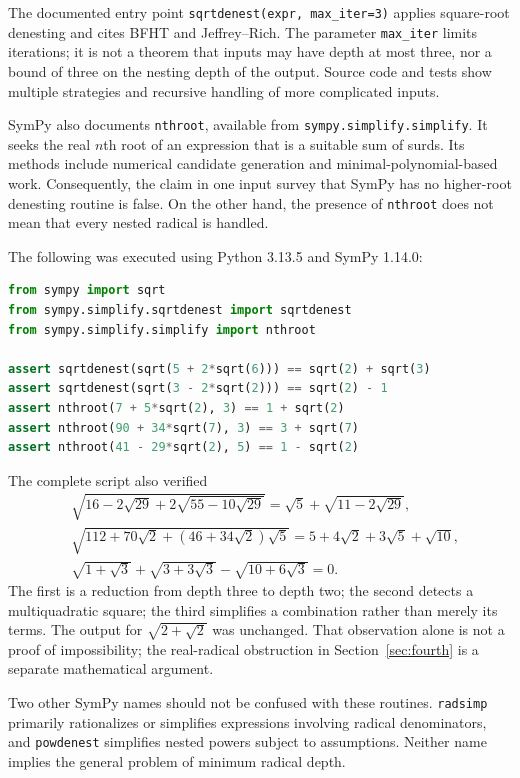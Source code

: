 \documentclass[11pt,a4paper]{article}
\theoremstyle{definition}
\theoremstyle{remark}
\numberwithin{equation}{section}
\begin{document}
The documented entry point \texttt{sqrtdenest(expr, max\_iter=3)} applies square-root denesting and cites BFHT and Jeffrey--Rich. The parameter \texttt{max\_iter} limits iterations; it is not a theorem that inputs may have depth at most three, nor a bound of three on the nesting depth of the output. Source code and tests show multiple strategies and recursive handling of more complicated inputs.\cite{sympydocs,sympysource,sympytests}

SymPy also documents \texttt{nthroot}, available from \texttt{sympy.simplify.simplify}. It seeks the real $n$th root of an expression that is a suitable sum of surds. Its methods include numerical candidate generation and minimal-polynomial-based work. Consequently, the claim in one input survey that SymPy has no higher-root denesting routine is false. On the other hand, the presence of \texttt{nthroot} does not mean that every nested radical is handled.\cite{sympydocs}

The following was executed using Python 3.13.5 and SymPy 1.14.0:
\begin{lstlisting}[language=Python]
from sympy import sqrt
from sympy.simplify.sqrtdenest import sqrtdenest
from sympy.simplify.simplify import nthroot

assert sqrtdenest(sqrt(5 + 2*sqrt(6))) == sqrt(2) + sqrt(3)
assert sqrtdenest(sqrt(3 - 2*sqrt(2))) == sqrt(2) - 1
assert nthroot(7 + 5*sqrt(2), 3) == 1 + sqrt(2)
assert nthroot(90 + 34*sqrt(7), 3) == 3 + sqrt(7)
assert nthroot(41 - 29*sqrt(2), 5) == 1 - sqrt(2)
\end{lstlisting}

The complete script also verified
\begin{align}
 &\sqrt{16-2\sqrt{29}+2\sqrt{55-10\sqrt{29}}}
     =\sqrt5+\sqrt{11-2\sqrt{29}},\label{eq:deepcas}\\
 &\sqrt{112+70\sqrt2+(46+34\sqrt2)\sqrt5}
     =5+4\sqrt2+3\sqrt5+\sqrt{10},\label{eq:multicas}\\
 &\sqrt{1+\sqrt3}+\sqrt{3+3\sqrt3}-\sqrt{10+6\sqrt3}=0.\label{eq:cancelcas}
\end{align}
The first is a reduction from depth three to depth two; the second detects a multiquadratic square; the third simplifies a combination rather than merely its terms. The output for $\sqrt{2+\sqrt2}$ was unchanged. That observation alone is not a proof of impossibility; the real-radical obstruction in Section~\ref{sec:fourth} is a separate mathematical argument.

Two other SymPy names should not be confused with these routines. \texttt{radsimp} primarily rationalizes or simplifies expressions involving radical denominators, and \texttt{powdenest} simplifies nested powers subject to assumptions. Neither name implies the general problem of minimum radical depth.\cite{sympydocs}
\end{document}
